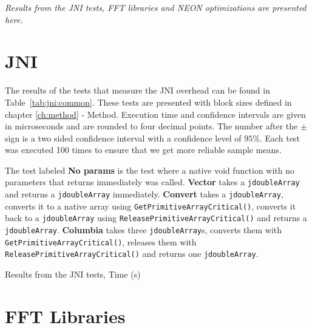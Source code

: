 \textit{Results from the JNI tests, FFT libraries and NEON optimizations are presented here.}

\section{JNI}
The results of the tests that measure the JNI overhead can be found in Table~\ref{tab:jni:common}. These tests are presented with block sizes defined in chapter \ref{ch:method} - Method. Execution time and confidence intervals are given in microseconds and are rounded to four decimal points. The number after the $\pm$ sign is a two sided confidence interval with a confidence level of $95\%$. Each test was executed 100 times to ensure that we get more reliable sample means.

The test labeled \textbf{No params} is the test where a native void function with no parameters that returns immediately was called. \textbf{Vector} takes a \texttt{jdoubleArray} and returns a \texttt{jdoubleArray} immediately. \textbf{Convert} takes a \texttt{jdoubleArray}, converts it to a native array using \texttt{GetPrimitiveArrayCritical()}, converts it back to a \texttt{jdoubleArray} using \texttt{ReleasePrimitiveArrayCritical()} and returns a \texttt{jdoubleArray}. \textbf{Columbia} takes three \texttt{jdoubleArray}s, converts them with \texttt{GetPrimitiveArrayCritical()}, releases them with \texttt{ReleasePrimitiveArrayCritical()} and returns one \texttt{jdoubleArray}.


\begin{table}[H]
    \centering
    \caption{Results from the JNI tests, Time (\textmu s)}
    \label{tab:jni:common}
    
\end{table}



\section{FFT Libraries}

